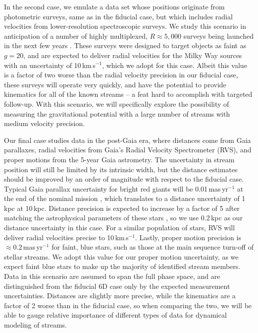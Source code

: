 \documentclass[modern]{aastex61}
\begin{document}
In the second case, we emulate a data set whose positions originate from photometric surveys, same as in the fiducial case, but which includes radial velocities from lower-resolution spectroscopic surveys.
We study this scenario in anticipation of a number of highly multiplexed, $R\approx5,000$ surveys being launched in the next few years \citep[e.g., DESI,][]{desi}.
These surveys were designed to target objects as faint as $g=20$, and are expected to deliver radial velocities for the Milky Way sources with an uncertainty of 10\,km\,s$^{-1}$, which we adopt for this case.
Albeit this value is a factor of two worse than the radial velocity precision in our fiducial case, these surveys will operate very quickly, and have the potential to provide kinematics for all of the known streams -- a feat hard to accomplish with targeted follow-up.
With this scenario, we will specifically explore the possibility of measuring the gravitational potential with a large number of streams with medium velocity precision.

Our final case studies data in the post-Gaia era, where distances come from Gaia parallaxes, radial velocities from Gaia's Radial Velocity Spectrometer (RVS), and proper motions from the 5-year Gaia astrometry.
The uncertainty in stream position will still be limited by its intrinsic width, but the distance estimates should be improved by an order of magnitude with respect to the fiducial case.
Typical Gaia parallax uncertainty for bright red giants will be 0.01\,mas\,yr$^{-1}$ at the end of the nominal mission \citep{perryman2001, prusti2016}, which translates to a distance uncertainty of 1\,kpc at 10\,kpc.
Distance precision is expected to increase by a factor of 5 after matching the astrophysical parameters of these stars \citep{mcmillan2017, ting2018}, so we use 0.2\,kpc as our distance uncertainty in this case.
For a similar population of stars, RVS will deliver radial velocities precise to 10\,km\,s$^{-1}$.
Lastly, proper motion precision is $\approx0.2$\,mas\,yr$^{-1}$ for faint, blue stars, such as those at the main sequence turn-off of stellar streams.
We adopt this value for our proper motion uncertainty, as we expect faint blue stars to make up the majority of identified stream members.
Data in this scenario are assumed to span the full phase space, and are distinguished from the fiducial 6D case only by the expected measurement uncertainties.
Distances are slightly more precise, while the kinematics are a factor of 2 worse than in the fiducial case, so when comparing the two, we will be able to gauge relative importance of different types of data for dynamical modeling of streams.
\end{document}
